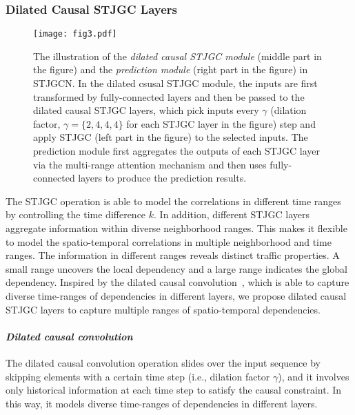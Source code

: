 \documentclass[10pt,journal,compsoc]{IEEEtran}
\begin{document}
\subsubsection{Dilated Causal STJGC Layers} \label{Dilated Causal STJGC Layers}

\begin{figure*}
	\centering
	\texttt{[image: fig3.pdf]}
	\caption{The illustration of the \textit{dilated causal STJGC module} (middle part in the figure) and the \textit{prediction module} (right part in the figure) in STJGCN. In the dilated csusal STJGC module, the inputs are first transformed by fully-connected layers and then be passed to the dilated causal STJGC layers, which pick inputs every $ \gamma $ (dilation factor, $ \gamma=\{2,4,4,4\} $ for each STJGC layer in the figure) step and apply STJGC (left part in the figure) to the selected inputs. The prediction module first aggregates the outputs of each STJGC layer via the multi-range attention mechanism and then uses fully-connected layers to produce the prediction results.}
	\label{fig3}
\end{figure*}

The STJGC operation is able to model the correlations in different time ranges by controlling the time difference $ k $. In addition, different STJGC layers aggregate information within diverse neighborhood ranges. This makes it flexible to model the spatio-temporal correlations in multiple neighborhood and time ranges. The information in different ranges reveals distinct traffic properties. A small range uncovers the local dependency and a large range indicates the global dependency. Inspired by the dilated causal convolution~\cite{Oord-et-al:arXiv2016,Bai-et-al:arXiv2018}, which is able to capture diverse time-ranges of dependencies in different layers, we propose dilated causal STJGC layers to capture multiple ranges of spatio-temporal dependencies. 

\paragraph{\textit{Dilated causal convolution}} 

The dilated causal convolution operation slides over the input sequence by skipping elements with a certain time step (i.e., dilation factor $ \gamma $), and it involves only historical information at each time step to satisfy the causal constraint. In this way, it models diverse time-ranges of dependencies in different layers. 
\end{document}
